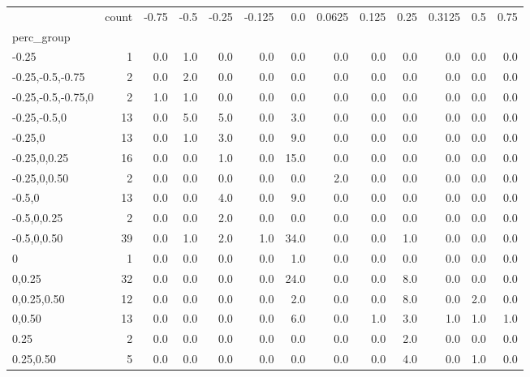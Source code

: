 \begin{tabular}{lrrrrrrrrrrrr}
\toprule
{} &  count &  -0.75 &  -0.5 &  -0.25 &  -0.125 &   0.0 &  0.0625 &  0.125 &  0.25 &  0.3125 &  0.5 &  0.75 \\
perc\_group         &        &        &       &        &         &       &         &        &       &         &      &       \\
\midrule
-0.25              &      1 &    0.0 &   1.0 &    0.0 &     0.0 &   0.0 &     0.0 &    0.0 &   0.0 &     0.0 &  0.0 &   0.0 \\
-0.25,-0.5,-0.75   &      2 &    0.0 &   2.0 &    0.0 &     0.0 &   0.0 &     0.0 &    0.0 &   0.0 &     0.0 &  0.0 &   0.0 \\
-0.25,-0.5,-0.75,0 &      2 &    1.0 &   1.0 &    0.0 &     0.0 &   0.0 &     0.0 &    0.0 &   0.0 &     0.0 &  0.0 &   0.0 \\
-0.25,-0.5,0       &     13 &    0.0 &   5.0 &    5.0 &     0.0 &   3.0 &     0.0 &    0.0 &   0.0 &     0.0 &  0.0 &   0.0 \\
-0.25,0            &     13 &    0.0 &   1.0 &    3.0 &     0.0 &   9.0 &     0.0 &    0.0 &   0.0 &     0.0 &  0.0 &   0.0 \\
-0.25,0,0.25       &     16 &    0.0 &   0.0 &    1.0 &     0.0 &  15.0 &     0.0 &    0.0 &   0.0 &     0.0 &  0.0 &   0.0 \\
-0.25,0,0.50       &      2 &    0.0 &   0.0 &    0.0 &     0.0 &   0.0 &     2.0 &    0.0 &   0.0 &     0.0 &  0.0 &   0.0 \\
-0.5,0             &     13 &    0.0 &   0.0 &    4.0 &     0.0 &   9.0 &     0.0 &    0.0 &   0.0 &     0.0 &  0.0 &   0.0 \\
-0.5,0,0.25        &      2 &    0.0 &   0.0 &    2.0 &     0.0 &   0.0 &     0.0 &    0.0 &   0.0 &     0.0 &  0.0 &   0.0 \\
-0.5,0,0.50        &     39 &    0.0 &   1.0 &    2.0 &     1.0 &  34.0 &     0.0 &    0.0 &   1.0 &     0.0 &  0.0 &   0.0 \\
0                  &      1 &    0.0 &   0.0 &    0.0 &     0.0 &   1.0 &     0.0 &    0.0 &   0.0 &     0.0 &  0.0 &   0.0 \\
0,0.25             &     32 &    0.0 &   0.0 &    0.0 &     0.0 &  24.0 &     0.0 &    0.0 &   8.0 &     0.0 &  0.0 &   0.0 \\
0,0.25,0.50        &     12 &    0.0 &   0.0 &    0.0 &     0.0 &   2.0 &     0.0 &    0.0 &   8.0 &     0.0 &  2.0 &   0.0 \\
0,0.50             &     13 &    0.0 &   0.0 &    0.0 &     0.0 &   6.0 &     0.0 &    1.0 &   3.0 &     1.0 &  1.0 &   1.0 \\
0.25               &      2 &    0.0 &   0.0 &    0.0 &     0.0 &   0.0 &     0.0 &    0.0 &   2.0 &     0.0 &  0.0 &   0.0 \\
0.25,0.50          &      5 &    0.0 &   0.0 &    0.0 &     0.0 &   0.0 &     0.0 &    0.0 &   4.0 &     0.0 &  1.0 &   0.0 \\
\bottomrule
\end{tabular}
